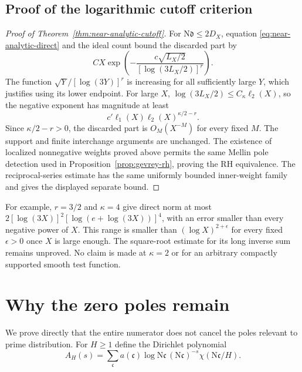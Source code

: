 \documentclass[11pt]{article}
\newcommand{\N}{\mathrm N}
\begin{document}
\subsection{Proof of the logarithmic cutoff criterion}
\begin{proof}[Proof of Theorem~\ref{thm:near-analytic-cutoff}]
For $\N\mathfrak d\le2D_X$, equation
\eqref{eq:near-analytic-direct} and the ideal count bound the
discarded part by
\[
 C X\exp\left(-\frac{c\sqrt{L_X/2}}
                         {[\log(3L_X/2)]^r}\right).
\]
The function $\sqrt Y/[\log(3Y)]^r$ is increasing for all sufficiently
large $Y$, which justifies using its lower endpoint. For large $X$,
$\log(3L_X/2)\le C_\kappa\ell_2(X)$, so the negative exponent has
magnitude at least
\[
 c'\ell_1(X)\ell_2(X)^{\kappa/2-r}.
\]
Since $\kappa/2-r>0$, the discarded part is $O_M(X^{-M})$
for every fixed $M$. The support and finite interchange arguments
are unchanged. The existence of localized nonnegative weights
proved above permits the same Mellin pole detection used in
Proposition~\ref{prop:gevrey-rh}, proving the RH equivalence.
The reciprocal-series estimate has the same uniformly bounded
inner-weight family and gives the displayed separate bound.
\end{proof}

For example, $r=3/2$ and $\kappa=4$ give direct norm at most
$2[\log(3X)]^2[\log(e+\log(3X))]^4$, with an error smaller
than every negative power of $X$. This range is smaller than
$(\log X)^{2+\epsilon}$ for every fixed $\epsilon>0$ once $X$
is large enough. The square-root estimate for its long inverse
sum remains unproved. No claim is made at $\kappa=2$ or for an
arbitrary compactly supported smooth test function.

\section{Why the zero poles remain}
We prove directly that the entire numerator does not cancel
the poles relevant to prime distribution.
For $H\ge1$ define the Dirichlet polynomial
\[
 A_H(s)=\sum_{\mathfrak c}
  a(\mathfrak c)\log\N\mathfrak c\,
  (\N\mathfrak c)^{-s}\chi(\N\mathfrak c/H).
\]
\end{document}
